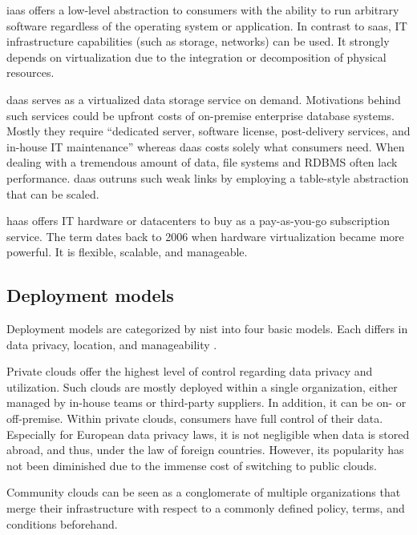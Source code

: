 \ac{iaas} offers a low-level abstraction to consumers with the ability to run arbitrary software regardless of the operating system or application.
In contrast to \ac{saas}, IT infrastructure capabilities (such as storage, networks) can be used.
It strongly depends on virtualization due to the integration or decomposition of physical resources. \cite{Mell2011}

\ac{daas} serves as a virtualized data storage service on demand. Motivations behind such services could be upfront costs of on-premise enterprise database systems. \cite{Dillon2010}
Mostly they require \enquote{dedicated server, software license, post-delivery services, and in-house IT maintenance} \cite{Dillon2010} whereas \ac{daas} costs solely what consumers need.
When dealing with a tremendous amount of data, file systems and RDBMS often lack performance.
\ac{daas} outruns such weak links by employing a table-style abstraction that can be scaled. \cite{Dillon2010}

\ac{haas} offers IT hardware or datacenters to buy as a pay-as-you-go subscription service.
The term dates back to 2006 when hardware virtualization became more powerful.
It is flexible, scalable, and manageable. \cite{Wang2010}

\subsection{Deployment models}
\label{subsec:cloud-deployment}

Deployment models are categorized by \ac{nist} into four basic models.
Each differs in data privacy, location, and manageability \cite{Mell2011}.

Private clouds offer the highest level of control regarding data privacy and utilization. Such clouds are mostly deployed within a single organization, either managed by in-house teams or third-party suppliers.
In addition, it can be on- or off-premise.
Within private clouds, consumers have full control of their data.
Especially for European data privacy laws, it is not negligible when data is stored abroad, and thus, under the law of foreign countries.
However, its popularity has not been diminished due to the immense cost of switching to public clouds. \cite{Dillon2010, Mell2011}

Community clouds can be seen as a conglomerate of multiple organizations that merge their infrastructure with respect to a commonly defined policy, terms, and conditions beforehand. \cite{Mell2011}

